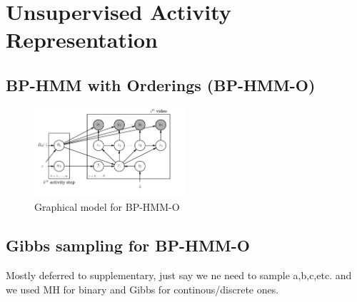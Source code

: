 \section{Unsupervised Activity Representation}
\subsection{BP-HMM with Orderings (BP-HMM-O)}
\begin{figure}[h!]
  \includegraphics[width=0.5\textwidth]{plate}
  \caption{Graphical model for BP-HMM-O}
  \label{bphmmo}
\end{figure}

\subsection{Gibbs sampling for BP-HMM-O}
Mostly deferred to supplementary, just say we ne need to sample a,b,c,etc. and we used MH for binary and Gibbs for continous/discrete ones.

